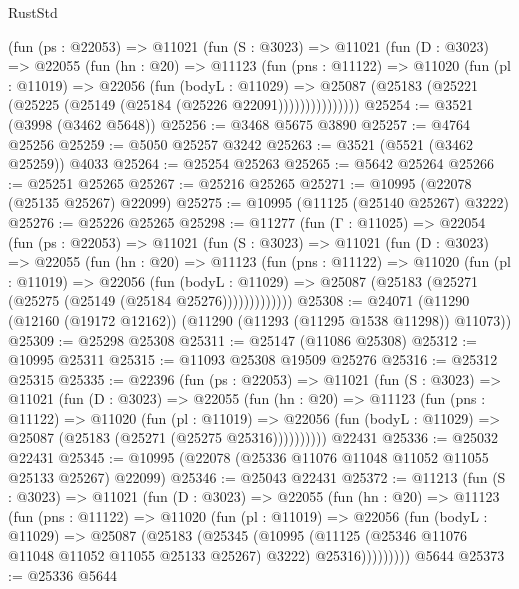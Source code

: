 \begin{lexlean}{RustStd}
\begin{coremodule}
        (fun (ps : @22053) =>
        @11021
          (fun (S : @3023) =>
          @11021
            (fun (D : @3023) =>
            @22055
              (fun (hn : @20) =>
              @11123
                (fun (pns : @11122) =>
                @11020
                  (fun (pl : @11019) =>
                  @22056
                    (fun (bodyL : @11029) =>
                    @25087 (@25183 (@25221 (@25225 (@25149 (@25184 (@25226 @22091)))))))))))))))
@25254 := @3521 (@3998 (@3462 @5648))
@25256 := @3468 @5675 @3890
@25257 := @4764 @25256
@25259 := @5050 @25257 @3242
@25263 := @3521 (@5521 (@3462 @25259)) @4033
@25264 := @25254 @25263
@25265 := @5642 @25264
@25266 := @25251 @25265
@25267 := @25216 @25265
@25271 := @10995 (@22078 (@25135 @25267) @22099)
@25275 := @10995 (@11125 (@25140 @25267) @3222)
@25276 := @25226 @25265
@25298 := @11277
    (fun (Γ : @11025) =>
    @22054
      (fun (ps : @22053) =>
      @11021
        (fun (S : @3023) =>
        @11021
          (fun (D : @3023) =>
          @22055
            (fun (hn : @20) =>
            @11123
              (fun (pns : @11122) =>
              @11020
                (fun (pl : @11019) =>
                @22056
                  (fun (bodyL : @11029) =>
                  @25087 (@25183 (@25271 (@25275 (@25149 (@25184 @25276)))))))))))))
@25308 := @24071 (@11290 (@12160 (@19172 @12162)) (@11290 (@11293 (@11295 @1538 @11298)) @11073))
@25309 := @25298 @25308
@25311 := @25147 (@11086 @25308)
@25312 := @10995 @25311
@25315 := @11093 @25308 @19509 @25276
@25316 := @25312 @25315
@25335 := @22396
    (fun (ps : @22053) =>
    @11021
      (fun (S : @3023) =>
      @11021
        (fun (D : @3023) =>
        @22055
          (fun (hn : @20) =>
          @11123
            (fun (pns : @11122) =>
            @11020
              (fun (pl : @11019) =>
              @22056 (fun (bodyL : @11029) => @25087 (@25183 (@25271 (@25275 @25316))))))))))
    @22431
@25336 := @25032 @22431
@25345 := @10995 (@22078 (@25336 @11076 @11048 @11052 @11055 @25133 @25267) @22099)
@25346 := @25043 @22431
@25372 := @11213
    (fun (S : @3023) =>
    @11021
      (fun (D : @3023) =>
      @22055
        (fun (hn : @20) =>
        @11123
          (fun (pns : @11122) =>
          @11020
            (fun (pl : @11019) =>
            @22056
              (fun (bodyL : @11029) =>
              @25087
                (@25183
                  (@25345
                    (@10995
                      (@11125 (@25346 @11076 @11048 @11052 @11055 @25133 @25267) @3222)
                      @25316)))))))))
    @5644
@25373 := @25336 @5644

\end{coremodule}
\end{lexlean}
